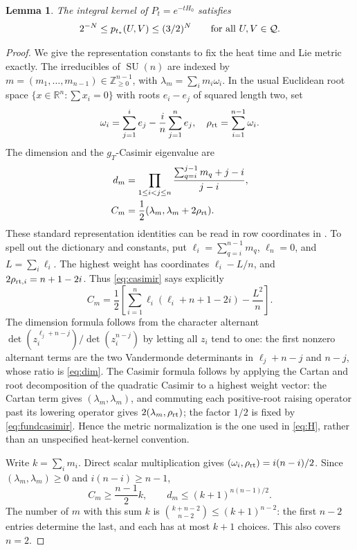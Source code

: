 \documentclass[11pt]{article}
\newtheorem{lemma}[theorem]{Lemma}
\theoremstyle{definition}
\newcommand{\SU}{\operatorname{SU}}
\begin{document}
\begin{lemma}\label{lem:heat}
The integral kernel of $P_t=e^{-tH_0}$ satisfies
\begin{equation}\label{eq:kernelbounds}
 2^{-N}\leq p_{t_*}(U,V)\leq(3/2)^N
 \qquad\hbox{for all }U,V\in\mathcal Q.
\end{equation}
\end{lemma}
\begin{proof}
We give the representation constants to fix the heat time and Lie
metric exactly. The irreducibles of $\SU(n)$ are indexed by
$m=(m_1,\ldots,m_{n-1})\in\mathbb Z_{\geq0}^{n-1}$, with
$\lambda_m=\sum_i m_i\omega_i$. In the usual Euclidean root space
$\{x\in\mathbb R^n:\sum x_i=0\}$ with roots $e_i-e_j$ of squared
length two, set
\[
 \omega_i=\sum_{j=1}^i e_j-\frac in\sum_{j=1}^n e_j,
 \quad \rho_{\rm rt}=\sum_{i=1}^{n-1}\omega_i.
\]
The dimension and the $g_T$-Casimir eigenvalue are
\begin{align}
 d_m&=\prod_{1\leq i<j\leq n}
       \frac{\sum_{q=i}^{j-1}m_q+j-i}{j-i},\label{eq:dim}\\
 C_m&=\frac12(\lambda_m,\lambda_m+2\rho_{\rm rt}).\label{eq:casimir}
\end{align}
These standard representation identities can be read in row coordinates
in \cite{PolychronakosSfetsos}. To spell out the dictionary and constants,
put $\ell_i=\sum_{q=i}^{n-1}m_q$, $\ell_n=0$, and $L=\sum_i\ell_i$.
The highest weight has coordinates $\ell_i-L/n$, and
$2\rho_{{\rm rt},i}=n+1-2i$. Thus \eqref{eq:casimir} says explicitly
\[
 C_m=\frac12\left[\sum_{i=1}^n\ell_i(\ell_i+n+1-2i)-\frac{L^2}{n}\right].
\]
The dimension formula follows from the character alternant
$\det(z_i^{\ell_j+n-j})/\det(z_i^{n-j})$ by letting all $z_i$ tend to
one: the first nonzero alternant terms are the two Vandermonde
determinants in $\ell_j+n-j$ and $n-j$, whose ratio is
\eqref{eq:dim}. The Casimir formula follows by applying the Cartan and
root decomposition of the quadratic Casimir to a highest weight
vector: the Cartan term gives $(\lambda_m,\lambda_m)$, and commuting
each positive-root raising operator past its lowering operator gives
$2(\lambda_m,\rho_{\rm rt})$; the factor $1/2$ is fixed by
\eqref{eq:fundcasimir}. Hence the metric normalization is the one used
in \eqref{eq:H}, rather than an unspecified heat-kernel convention.

Write $k=\sum_i m_i$. Direct scalar multiplication gives
$(\omega_i,\rho_{\rm rt})=i(n-i)/2$. Since
$(\lambda_m,\lambda_m)\geq0$ and $i(n-i)\geq n-1$,
\[
 C_m\geq\frac{n-1}{2}k,\qquad
 d_m\leq(k+1)^{n(n-1)/2}.
\]
The number of $m$ with this sum $k$ is
$\binom{k+n-2}{n-2}\leq(k+1)^{n-2}$: the first $n-2$ entries determine
the last, and each has at most $k+1$ choices. This also covers $n=2$.


\end{proof}
\end{document}
